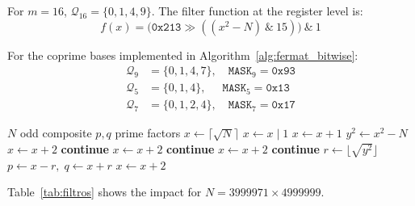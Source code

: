 \documentclass{sbc2023-pdf}%
\theoremstyle{plain}
\begin{document}
For \(m=16\), \(\mathcal{Q}_{16} = \{0,1,4,9\}\). The filter function at the register level is:
\[
f(x) = \bigl( \mathtt{0x213} \gg ((x^2 - N) \ \& \ 15) \bigr) \ \& \ 1
\]

For the coprime bases implemented in Algorithm~\ref{alg:fermat_bitwise}:
\begin{align*}
\mathcal{Q}_{9} &= \{0,1,4,7\},\quad \mathtt{MASK}_9 = \mathtt{0x93}\\
\mathcal{Q}_{5} &= \{0,1,4\},\quad \ \ \mathtt{MASK}_5 = \mathtt{0x13}\\
\mathcal{Q}_{7} &= \{0,1,2,4\},\quad \mathtt{MASK}_7 = \mathtt{0x17}
\end{align*}

\begin{algorithm}[H]
\caption{Fermat factorization with stacked bitwise filters}
\label{alg:fermat_bitwise}
\begin{algorithmic}[1]
\REQUIRE \(N\) odd composite
\ENSURE \(p,q\) prime factors
\STATE \(x \gets \lceil\sqrt{N}\rceil\)
   \STATE \(x \gets x \mid 1\) \ENDIF
\ELSE
   \STATE \(x \gets x + 1\) \ENDIF
\ENDIF
\LOOP
  \STATE \(y^2 \gets x^2 - N\)
    \STATE \(x \gets x + 2\) \STATE \textbf{continue}
  \ENDIF
    \STATE \(x \gets x + 2\) \STATE \textbf{continue}
  \ENDIF
    \STATE \(x \gets x + 2\) \STATE \textbf{continue}
  \ENDIF
  \STATE \(r \gets \lfloor\sqrt{y^2}\rfloor\)
    \STATE \RETURN \(p \gets x - r,\; q \gets x + r\)
  \ENDIF
  \STATE \(x \gets x + 2\)
\ENDLOOP
\end{algorithmic}
\end{algorithm}

Table~\ref{tab:filtros} shows the impact for \(N = 3999971 \times 4999999\).

\begin{table}[htbp]
\centering
\caption{Candidate rejection by stacked bitwise filters.}
\label{tab:filtros}
\end{table}
\end{document}
